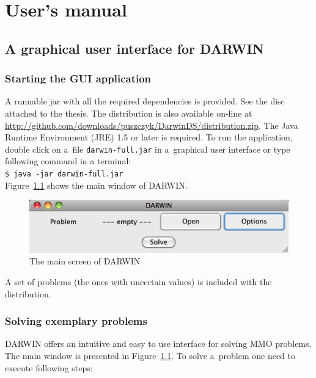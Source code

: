 \chapter{User's manual}
\label{user-manual}

\section*{A graphical user interface for DARWIN}

\subsection*{Starting the GUI application}

A runnable jar with all the required dependencies is provided. See the disc
attached to the thesis. The distribution is also available on-line at
\url{http://github.com/downloads/puszczyk/DarwinDS/distribution.zip}. The Java
Runtime Environment (JRE) 1.5 or later is required. To run the application,
double click on a~file \texttt{darwin-full.jar} in a~graphical user interface
or type following command in a terminal:\\
\texttt{\$ java -jar darwin-full.jar} \\
Figure~\ref{manual_01_main} shows the main window of DARWIN.

\begin{figure}[htb]
  \centering
  \includegraphics[scale=0.7]{img/manual/01_main_screen}
  \caption{The main screen of DARWIN}
  \label{manual_01_main}
\end{figure}

A set of problems (the ones with uncertain values) is included with the
distribution.

\subsection*{Solving exemplary problems}

DARWIN offers an intuitive and easy to use interface for solving MMO
problems. The main window is presented in Figure~\ref{manual_01_main}. To
solve a~problem one need to execute following steps:

